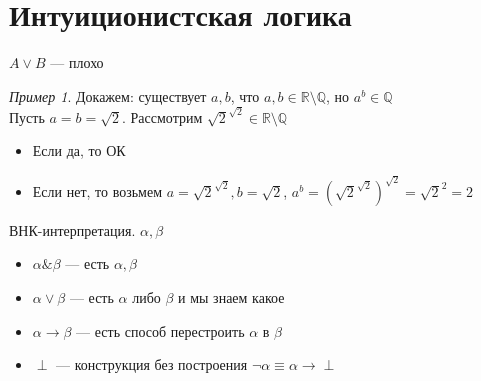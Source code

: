 \documentclass[english]{article}
\newcommand{\R}{\mathbb{R}}
\theoremstyle{plain}
\theoremstyle{remark}
\newtheorem*{examp}{Пример}
\theoremstyle{definition}
\begin{document}
\section{Интуиционистская логика}
\label{sec:org2cf52b4}
\(A \vee B\) --- плохо
\begin{examp}
Докажем: существует \(a, b\), что \(a, b \in \R \setminus \mathbb{Q}\), но \(a^b \in \mathbb{Q}\) \\
Пусть \(a = b = \sqrt{2}\). Рассмотрим \(\sqrt{2}^{\sqrt{2}} \in \R \setminus \mathbb{Q}\)
\begin{itemize}
\item Если да, то ОК
\item Если нет, то возьмем \(a = \sqrt{2}^{\sqrt{2}}, b = \sqrt{2}\), \(a^b = (\sqrt{2}^{\sqrt{2}})^{\sqrt{2}} = \sqrt{2}^{2} = 2\)
\end{itemize}
\end{examp}
\begin{defintion}
ВНК-интерпретация. \(\alpha, \beta\)
\begin{itemize}
\item \(\alpha \& \beta\) --- есть \(\alpha, \beta\)
\item \(\alpha \vee \beta\) --- есть \(\alpha\) либо \(\beta\) и мы знаем какое
\item \(\alpha \to \beta\) --- есть способ перестроить \(\alpha\) в \(\beta\)
\item \(\perp\) --- конструкция без построения \(\neg \alpha \equiv \alpha \to \perp\)
\end{itemize}
\end{defintion}
\end{document}
